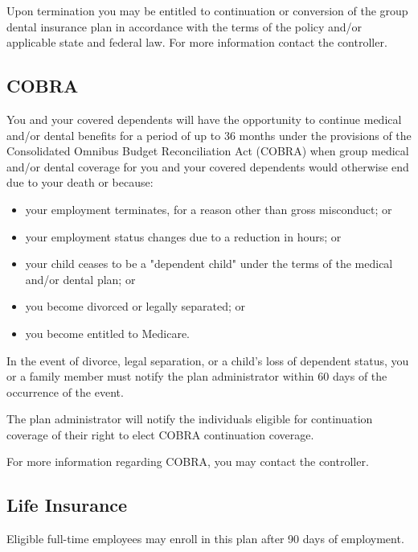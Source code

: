 \documentclass{book}
\begin{document}
Upon termination you may be entitled to continuation or conversion of the group dental insurance plan in accordance with the terms of the policy and/or applicable state and federal law. For more information contact the controller.

\subsection{COBRA}

You and your covered dependents will have the opportunity to continue medical and/or dental benefits for a period of up to 36 months under the provisions of the Consolidated Omnibus Budget Reconciliation Act (COBRA) when group medical and/or dental coverage for you and your covered dependents would otherwise end due to your death or because:

\begin{itemize} \item your employment terminates, for a reason other than gross misconduct; or

\item your employment status changes due to a reduction in hours; or

\item your child ceases to be a "dependent child" under the terms of the medical and/or dental plan; or

\item you become divorced or legally separated; or

\item you become entitled to Medicare. \end{itemize}

In the event of divorce, legal separation, or a child's loss of dependent status, you or a family member must notify the plan administrator within 60 days of the occurrence of the event.

The plan administrator will notify the individuals eligible for continuation coverage of their right to elect COBRA continuation coverage.

For more information regarding COBRA, you may contact the controller.

\subsection{Life Insurance}

Eligible full-time employees may enroll in this plan after 90 days of employment.
\end{document}
